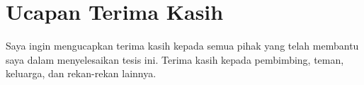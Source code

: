 \chapter*{Ucapan Terima Kasih}
Saya ingin mengucapkan terima kasih kepada semua pihak yang telah membantu saya dalam menyelesaikan tesis ini. Terima kasih kepada pembimbing, teman, keluarga, dan rekan-rekan lainnya.
